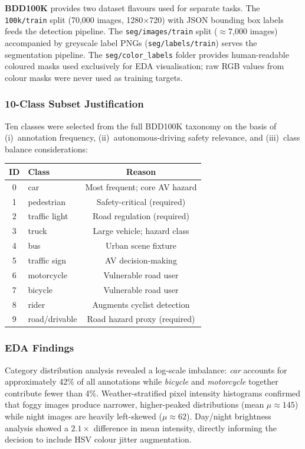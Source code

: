 \documentclass[10pt,twocolumn]{article}
\begin{document}
\textbf{BDD100K} provides two dataset flavours used for separate tasks.
The \texttt{100k/train} split (70{,}000 images, 1280$\times$720) with JSON
bounding box labels feeds the detection pipeline.  The \texttt{seg/images/train}
split ($\approx$7{,}000 images) accompanied by greyscale label PNGs
(\texttt{seg/labels/train}) serves the segmentation pipeline.
The \texttt{seg/color\_labels} folder provides human-readable coloured masks
used exclusively for EDA visualisation; raw RGB values from colour masks were
never used as training targets.

\subsubsection{10-Class Subset Justification}

Ten classes were selected from the full BDD100K taxonomy on the basis of
(i)~annotation frequency, (ii)~autonomous-driving safety relevance, and
(iii)~class balance considerations:

\begin{center}
\small
\begin{tabular}{@{}clc@{}}
\toprule
\textbf{ID} & \textbf{Class} & \textbf{Reason} \\
\midrule
0 & car           & Most frequent; core AV hazard \\
1 & pedestrian    & Safety-critical (required) \\
2 & traffic light & Road regulation (required) \\
3 & truck         & Large vehicle; hazard class \\
4 & bus           & Urban scene fixture \\
5 & traffic sign  & AV decision-making \\
6 & motorcycle    & Vulnerable road user \\
7 & bicycle       & Vulnerable road user \\
8 & rider         & Augments cyclist detection \\
9 & road/drivable & Road hazard proxy (required) \\
\bottomrule
\end{tabular}
\end{center}

\subsubsection{EDA Findings}

Category distribution analysis revealed a log-scale imbalance: \textit{car}
accounts for approximately 42\% of all annotations while \textit{bicycle} and
\textit{motorcycle} together contribute fewer than 4\%.
Weather-stratified pixel intensity histograms confirmed that foggy images
produce narrower, higher-peaked distributions (mean $\mu \approx 145$) while
night images are heavily left-skewed ($\mu \approx 62$).
Day/night brightness analysis showed a $2.1\times$ difference in mean intensity,
directly informing the decision to include HSV colour jitter augmentation.
\end{document}
